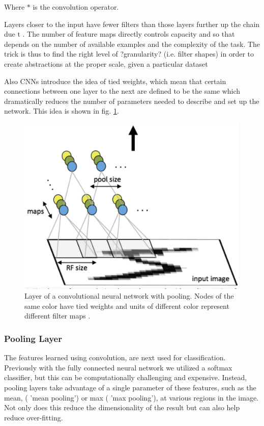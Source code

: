 \documentclass[12pt, twocolumn]{article}
\begin{document}
 Where $\ast$ is the convolution operator. 
 
 Layers closer to the input have fewer filters than those layers further up the chain due t . The number of feature maps directly controls capacity and so that depends on the number of available examples and the complexity of the task. The trick is thus to find the right level of ?granularity? (i.e. filter shapes) in order to create abstractions at the proper scale, given a particular dataset

Also CNNs introduce the idea of tied weights, which mean that certain connections between one layer to the next are defined to be the same which dramatically reduces the number of parameters needed to describe and set up the network. This idea is shown in fig. \ref{fig:conv}.



\begin{figure}
\includegraphics[scale=.4]{convgraphic.png}

\caption{Layer of a convolutional neural network with pooling. Nodes of the same color have tied weights and units of different color represent different filter maps \cite{StanfordTut}. }
\label{fig:conv}
\end{figure}


\subsubsection{Pooling Layer}
The features learned using convolution, are next used for classification. Previously with the fully connected neural network we utilized a softmax classifier, but this can be computationally challenging and expensive. Instead, pooling layers take advantage of a single parameter of these features, such as the mean, ( 'mean pooling') or max ( 'max pooling'), at  various regions in the image. Not only does this reduce the dimensionality of the result but can also help reduce over-fitting.
\end{document}
